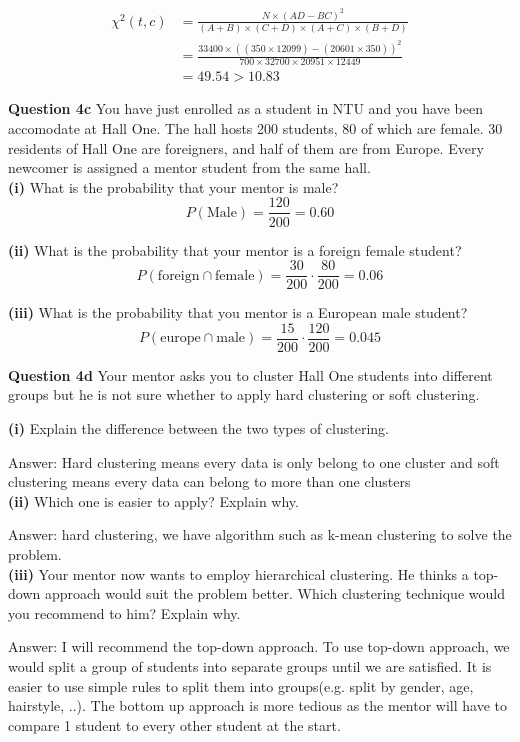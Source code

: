 \documentclass[11pt,a4paper]{report}
\begin{document}
\begin{multicols*}{2}
\begin{equation*}
\begin{split}
   \chi^2(t,c) &= \frac{N\times (AD - BC)^2}{(A+B) \times (C+D) \times (A+C) \times (B+D)} \\
   &= \frac{33400\times ((350 \times 12099) - (20601 \times 350))^2}{700\times 32700 \times 20951 \times 12449}\\
   &= 49.54 > 10.83
\end{split}
\end{equation*}

\noindent \textbf{Question 4c} You have just enrolled as a student in NTU and you have been accomodate at Hall One. The hall hosts 200 students, 80 of which are female. 30 residents of Hall One are foreigners, and half of them are from Europe. Every newcomer is assigned a mentor student from the same hall.\\

\noindent \textbf{(i)} What is the probability that your mentor is male?
$$P(\text{Male}) = \frac{120}{200} = 0.60$$

\noindent \textbf{(ii)} What is the probability that your mentor is a foreign female student?
$$P(\text{foreign} \cap \text{female}) = \frac{30}{200}\cdot \frac{80}{200}=0.06$$

\noindent \textbf{(iii)} What is the probability that you mentor is a European male student?
$$P(\text{europe} \cap \text{male}) = \frac{15}{200}\cdot \frac{120}{200}=0.045$$

\noindent \textbf{Question 4d} Your mentor asks you to cluster Hall One students into different groups but he is not sure whether to apply hard clustering or soft clustering.

\noindent \textbf{(i)} Explain the difference between the two types of clustering.

\noindent Answer: Hard clustering means every data is only belong to one cluster and soft clustering means every data can belong to more than one clusters\\

\noindent \textbf{(ii)} Which one is easier to apply? Explain why.

\noindent Answer: hard clustering, we have algorithm such as k-mean clustering to solve the problem.\\

\noindent \textbf{(iii)} Your mentor now wants to employ hierarchical clustering. He thinks a top-down approach would suit the problem better. Which clustering technique would you recommend to him? Explain why. 

\noindent Answer: I will recommend the top-down approach. To use top-down approach, we would split a group of students into separate groups until we are satisfied. It is easier to use simple rules to split them into groups(e.g. split by gender, age, hairstyle, ..). The bottom up approach is more tedious as the mentor will have to compare 1 student to every other student at the start.  

\end{multicols*}
\end{document}
